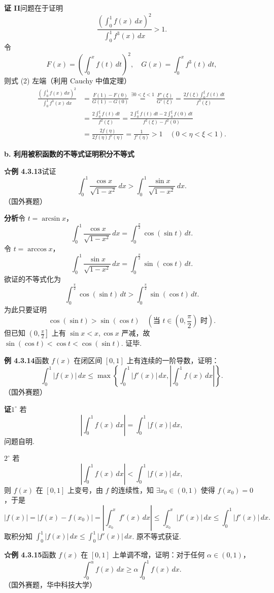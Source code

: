 \documentclass[UTF8, 12pt, fontset=fandol, oneside]{ctexart}
\begin{document}
\noindent\textbf{证 II}\quad 问题在于证明
\[
\frac{\left(\int_0^1 f(x)\,dx\right)^2}{\int_0^1 f^3(x)\,dx}>1.
\tag{2}
\]
令
\[
F(x)=\left(\int_0^x f(t)\,dt\right)^2,\quad
G(x)=\int_0^x f^3(t)\,dt,
\]
则式 (2) 左端（利用 Cauchy 中值定理）
\[
\begin{aligned}
\frac{\left(\int_0^1 f(x)\,dx\right)^2}{\int_0^1 f^3(x)\,dx}
&=\frac{F(1)-F(0)}{G(1)-G(0)}
\overset{\exists0<\xi<1}{=}
\frac{F'(\xi)}{G'(\xi)}
=\frac{2f(\xi)\int_0^\xi f(t)\,dt}{f^3(\xi)}\\
&=\frac{2\int_0^\xi f(t)\,dt}{f^2(\xi)}
=\frac{2\int_0^\xi f(t)\,dt-2\int_0^\xi f(0)\,dt}{f^2(\xi)-f^2(0)}\\
&=\frac{2f(\eta)}{2f(\eta)f'(\eta)}
=\frac1{f'(\eta)}>1\quad(0<\eta<\xi<1).
\end{aligned}
\]

\noindent\textbf{b. 利用被积函数的不等式证明积分不等式}

\noindent\textbf{☆例 4.3.13}\quad 试证
\[
\int_0^1\frac{\cos x}{\sqrt{1-x^2}}\,dx
>\int_0^1\frac{\sin x}{\sqrt{1-x^2}}\,dx.
\tag{1}
\]
（国外赛题）

\noindent\textbf{分析}\quad 令 $t=\arcsin x$，
\[
\int_0^1\frac{\cos x}{\sqrt{1-x^2}}\,dx
=\int_0^{\frac\pi2}\cos(\sin t)\,dt.
\]
令 $t=\arccos x$，
\[
\int_0^1\frac{\sin x}{\sqrt{1-x^2}}\,dx
=\int_0^{\frac\pi2}\sin(\cos t)\,dt.
\]
欲证的不等式化为
\[
\int_0^{\frac\pi2}\cos(\sin t)\,dt
>\int_0^{\frac\pi2}\sin(\cos t)\,dt.
\tag{2}
\]
为此只要证明
\[
\cos(\sin t)>\sin(\cos t)\quad\left(\text{当 }t\in\left(0,\frac\pi2\right)\text{ 时}\right).
\tag{3}
\]
但已知 $\left(0,\frac\pi2\right]$ 上有 $\sin x<x,\cos x$ 严减，故 $\sin(\cos t)<\cos t<\cos(\sin t)$. 证毕.

\noindent\textbf{例 4.3.14}\quad 函数 $f(x)$ 在闭区间 $[0,1]$ 上有连续的一阶导数，证明：
\[
\int_0^1|f(x)|\,dx
\le\max\left\{\int_0^1|f'(x)|\,dx,\left|\int_0^1 f(x)\,dx\right|\right\}.
\]
（国外赛题）

\noindent\textbf{证}\quad $1^\circ$ 若
\[
\left|\int_0^1 f(x)\,dx\right|=\int_0^1|f(x)|\,dx,
\]
问题自明.

\noindent $2^\circ$ 若
\[
\left|\int_0^1 f(x)\,dx\right|<\int_0^1|f(x)|\,dx,
\]
则 $f(x)$ 在 $[0,1]$ 上变号，由 $f$ 的连续性，知 $\exists x_0\in(0,1)$ 使得 $f(x_0)=0$，于是
\[
|f(x)|=|f(x)-f(x_0)|
=\left|\int_{x_0}^x f'(x)\,dx\right|
\le\int_{x_0}^x|f'(x)|\,dx
\le\int_0^1|f'(x)|\,dx.
\]
取积分知 $\int_0^1|f(x)|\,dx\le\int_0^1|f'(x)|\,dx$. 原不等式获证.

\noindent\textbf{☆例 4.3.15}\quad 函数 $f(x)$ 在 $[0,1]$ 上单调不增，证明：对于任何 $\alpha\in(0,1)$，
\[
\int_0^\alpha f(x)\,dx\ge\alpha\int_0^1 f(x)\,dx.
\tag{1}
\]
（国外赛题，华中科技大学）
\end{document}
